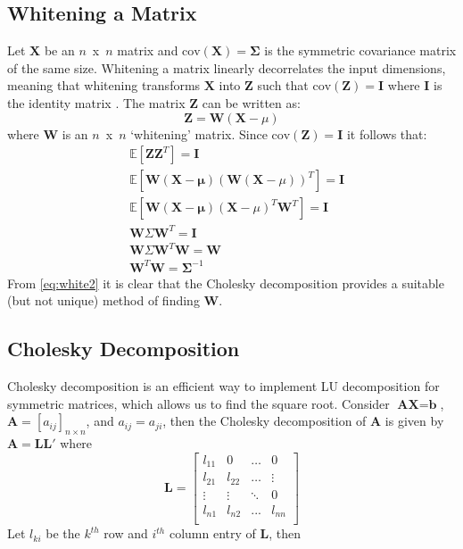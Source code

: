 \documentclass[14pt,a4paper]{article}
\begin{document}
\subsection{Whitening a Matrix}\label{a:whitening}
Let $\textbf{X}$ be an $n$~x~$n$ matrix and $\mbox{cov}(\textbf{X}) = \mathbf{\Sigma}$ is the symmetric covariance matrix of the same size.
Whitening a matrix linearly decorrelates the input dimensions, meaning that whitening transforms $\textbf{X}$ into $\textbf{Z}$ such that $\mbox{cov}(\textbf{Z}) = \textbf{I}$ where $\textbf{I}$ is the identity matrix \cite{kessy2017optimal}. 
The matrix $\textbf{Z}$ can be written as:
\begin{equation}
\textbf{Z} = \textbf{W}(\textbf{X} - \mu)
\label{eq:white1}
\end{equation}
where $\textbf{W}$ is an $n$~x~$n$ `whitening' matrix. Since $\mbox{cov}(\textbf{Z}) = \textbf{I}$ it follows that:
\begin{align}
&\mathbb{E}[\mathbf{Z}\mathbf{Z}^T] = \mathbf{I} \nonumber \\
&\mathbb{E}[\mathbf{W}(\mathbf{X - \mu})(\mathbf{W}(\mathbf{X} - \mu))^T] = \mathbf{I} \nonumber \\
&\mathbb{E}[\mathbf{W}(\mathbf{X - \mu})(\mathbf{X} - \mu)^T\mathbf{W}^T] = \mathbf{I} \nonumber \\
&\mathbf{W}\Sigma\mathbf{W}^T = \mathbf{I} \nonumber \\
&\mathbf{W}\Sigma\mathbf{W}^T\mathbf{W} = \mathbf{W} \nonumber \\
&\mathbf{W}^T \mathbf{W} = \mathbf{\Sigma}^{-1} \label{eq:white2}
\end{align}
From \eqref{eq:white2} it is clear that the Cholesky decomposition provides a suitable (but not unique) method of finding $\textbf{W}$.

\subsection{Cholesky Decomposition}
Cholesky decomposition is an efficient way to implement LU decomposition for symmetric matrices, which allows us to find the square root.
Consider $\textbf{A}\textbf{X} = \textbf{b}$, $\textbf{A}=[a_{ij}]_{n\times n}$, and $a_{ij} = a_{ji}$, then the Cholesky decomposition of $\textbf{A}$ is given by $\textbf{A} = \textbf{L}\textbf{L}'$ where
\begin{equation}
\textbf{L}=
\begin{bmatrix}
 l_{11} & 0 & \ldots & 0 \\
 l_{21} & l_{22} & \ldots & \vdots \\
 \vdots & \vdots & \ddots & 0 \\
 l_{n1} & l_{n2} & ... & l_{nn} \\
\end{bmatrix}
\label{eq:cholesky1}
\end{equation}
Let $l_{ki}$ be the $k^{th}$ row and $i^{th}$ column entry of $\textbf{L}$, then
\end{document}
